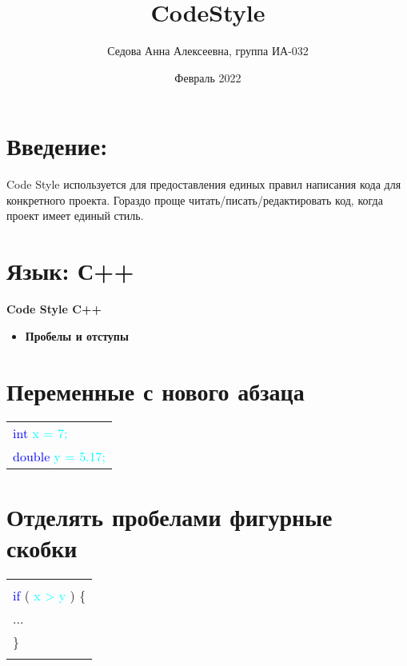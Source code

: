 \documentclass[12pt, letterpaper]{article}
\title{\textbf{CodeStyle}}
\author{Седова Анна Алексеевна, группа ИА-032}
\date{Февраль 2022}
\begin{document}
\maketitle
\newpage
\section{Введение:}
Code Style используется для предоставления единых правил написания кода для конкретного проекта. Гораздо проще читать/писать/редактировать код, когда проект имеет единый стиль.
\section{Язык: С++}

\newpage
\begin{center}
    \LARGE\textbf{Code Style C++}\hline
\end{center}

\begin{itemize}
    \item \Large\textbf{Пробелы и отступы}
\end{itemize}
\setcounter{section}{0}
\section{Переменные с нового абзаца}
\begin{flushleft}
\begin{tabular}{ |l| } 
 \hline
\textcolor{blue}{int} \textcolor{cyan}{x = 7;} \\
\textcolor{blue}{double} \textcolor{cyan}{y = 5.17;} \\
 \hline
\end{tabular}
\end{flushleft}
\section{Отделять пробелами фигурные скобки}
\begin{flushleft}
\begin{tabular}{ |l| } 
 \hline
\\
\textcolor{blue}{if} ( \textcolor{cyan}{x > y}  ) \{ \\
\qquad ... \\
\} \\ 
\\
 \hline
\end{tabular}
\end{flushleft}
\end{document}
